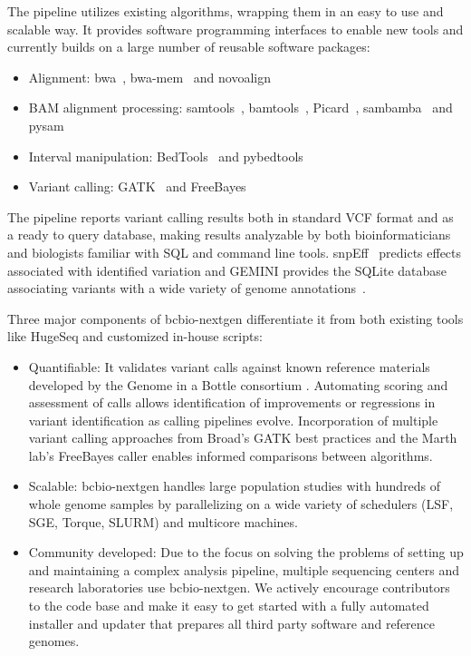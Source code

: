 \documentclass{frontiersSCNS}
\begin{document}
The pipeline utilizes existing algorithms, wrapping them in an easy to use and
scalable way. It provides software programming interfaces to enable new tools
and currently builds on a large number of reusable software packages:

\begin{itemize}
  \item Alignment: bwa~\citep{li_fast_2010}, bwa-mem~\citep{li_aligning_2013} and
    novoalign~\citep{novoalign}
  \item BAM alignment processing: samtools~\citep{li_sequence_2009},
    bamtools~\citep{bamtools}, Picard~\citep{picard},
    sambamba~\citep{sambamba} and pysam~\citep{pysam}
  \item Interval manipulation: BedTools~\citep{quinlan_bedtools:_2010} and
    pybedtools~\citep{dale_pybedtools:_2011}
  \item Variant calling: GATK~\citep{depristo_framework_2011} and
    FreeBayes~\citep{garrison_haplotype-based_2012}
\end{itemize}

The pipeline reports variant calling results both in standard VCF format and
as a ready to query database, making results analyzable by both
bioinformaticians and biologists familiar with SQL and command line tools.
snpEff~\citep{cingolani_program_2012} predicts effects associated with
identified variation and GEMINI provides the SQLite database associating
variants with a wide variety of genome annotations~\citep{paila_gemini:_2013}.

Three major components of bcbio-nextgen differentiate it from
both existing tools like HugeSeq \citep{lam_detecting_2012} and customized
in-house scripts:

\begin{itemize}
\item Quantifiable: It validates variant calls against known reference materials
  developed by the Genome in a Bottle consortium \citep{zook_integrating_2013}.
  Automating scoring and assessment of calls allows identification of
  improvements or regressions in variant identification as calling pipelines
  evolve. Incorporation of multiple variant calling approaches from Broad's GATK
  best practices \citep{van_der_auwera_fastq_2002} and the Marth lab's FreeBayes
  caller \citep{garrison_haplotype-based_2012} enables informed comparisons
  between algorithms.

\item Scalable: bcbio-nextgen handles large population studies with
  hundreds of whole genome samples by parallelizing on a wide variety
  of schedulers (LSF, SGE, Torque, SLURM) and multicore machines.

\item Community developed: Due to the focus on solving the problems
  of setting up and maintaining a complex analysis pipeline, multiple
  sequencing centers and research laboratories use bcbio-nextgen. We
  actively encourage contributors to the code base and make it easy to
  get started with a fully automated installer and updater that
  prepares all third party software and reference genomes.
\end{itemize}
\end{document}
